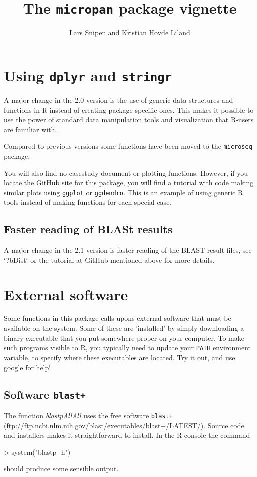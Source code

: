 \documentclass{article}
\title{The \texttt{micropan} package vignette}
\author{Lars Snipen and Kristian Hovde Liland}
\date{}
\begin{document}


\maketitle


\section{Using \texttt{dplyr} and \texttt{stringr}}
A major change in the 2.0 version is the use of generic data structures and functions in R instead of creating package specific ones. This makes it possible to use the power of standard data manipulation tools and visualization that R-users are familiar with.

Compared to previous versions some functions have been moved to the \texttt{microseq} package.

You will also find no casestudy document or plotting functions. However, if you locate the GitHub site for this package, you will find a tutorial with code making similar plots using \texttt{ggplot} or \texttt{ggdendro}. This is an example of using generic R tools instead of making functions for each special case.

\subsection{Faster reading of BLASt results}
A major change in the 2.1 version is faster reading of the BLAST result files, see `?bDist` or the tutorial at GitHub mentioned above for more details. 


\section{External software}
Some functions in this package calls upons external software that must be available on the system. Some of these are 'installed' by simply downloading a binary executable that you put somewhere proper on your computer. To make such programs visible to R, you typically need to update your \texttt{PATH} environment variable, to specify where these executables are located. Try it out, and use google for help!


\subsection{Software \texttt{blast+}}
The function \emph{blastpAllAll} uses the free software \texttt{blast+} (ftp://ftp.ncbi.nlm.nih.gov/blast/executables/blast+/LATEST/). Source code and installers makes it straightforward to install. In the R console the command
\begin{Schunk}
\begin{Sinput}
> system("blastp -h")
\end{Sinput}
\end{Schunk}
should produce some sensible output.
\end{document}
